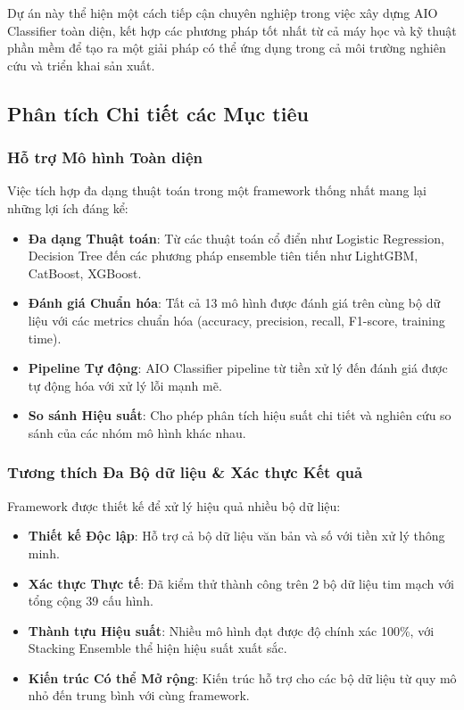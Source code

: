\vspace{1em}
\noindent
Dự án này thể hiện một cách tiếp cận chuyên nghiệp trong việc xây dựng AIO Classifier toàn diện, kết hợp các phương pháp tốt nhất từ cả máy học và kỹ thuật phần mềm để tạo ra một giải pháp có thể ứng dụng trong cả môi trường nghiên cứu và triển khai sản xuất.

\subsection{Phân tích Chi tiết các Mục tiêu}\label{subsec:detailed-goals}

\subsubsection{Hỗ trợ Mô hình Toàn diện}

Việc tích hợp đa dạng thuật toán trong một framework thống nhất mang lại những lợi ích đáng kể:

\begin{itemize}
    \item \textbf{Đa dạng Thuật toán}: Từ các thuật toán cổ điển như Logistic Regression, Decision Tree đến các phương pháp ensemble tiên tiến như LightGBM, CatBoost, XGBoost.
    \item \textbf{Đánh giá Chuẩn hóa}: Tất cả 13 mô hình được đánh giá trên cùng bộ dữ liệu với các metrics chuẩn hóa (accuracy, precision, recall, F1-score, training time).
    \item \textbf{Pipeline Tự động}: AIO Classifier pipeline từ tiền xử lý đến đánh giá được tự động hóa với xử lý lỗi mạnh mẽ.
    \item \textbf{So sánh Hiệu suất}: Cho phép phân tích hiệu suất chi tiết và nghiên cứu so sánh của các nhóm mô hình khác nhau.
\end{itemize}

\subsubsection{Tương thích Đa Bộ dữ liệu \& Xác thực Kết quả}

Framework được thiết kế để xử lý hiệu quả nhiều bộ dữ liệu:

\begin{itemize}
    \item \textbf{Thiết kế Độc lập}: Hỗ trợ cả bộ dữ liệu văn bản và số với tiền xử lý thông minh.
    \item \textbf{Xác thực Thực tế}: Đã kiểm thử thành công trên 2 bộ dữ liệu tim mạch với tổng cộng 39 cấu hình.
    \item \textbf{Thành tựu Hiệu suất}: Nhiều mô hình đạt được độ chính xác 100\%, với Stacking Ensemble thể hiện hiệu suất xuất sắc.
    \item \textbf{Kiến trúc Có thể Mở rộng}: Kiến trúc hỗ trợ cho các bộ dữ liệu từ quy mô nhỏ đến trung bình với cùng framework.
\end{itemize}

